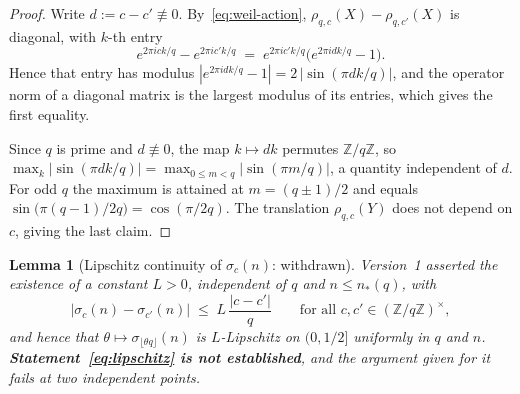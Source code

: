 \documentclass[12pt,a4paper]{article}
\newtheorem{lemma}[theorem]{Lemma}
\theoremstyle{definition}
\theoremstyle{remark}
\begin{document}
    \begin{proof}
      Write $d := c - c' \not\equiv 0$.
      By~\eqref{eq:weil-action}, $\rho_{q,c}(X) - \rho_{q,c'}(X)$ is diagonal, with $k$-th entry
      \begin{equation*}
        e^{2\pi i ck/q} - e^{2\pi i c'k/q}
        \;=\; e^{2\pi i c'k/q}\bigl(e^{2\pi i dk/q} - 1\bigr).
      \end{equation*}
      Hence that entry has modulus
      $|e^{2\pi i dk/q} - 1| = 2\,|\sin(\pi dk/q)|$, and the operator norm of a diagonal
      matrix is the largest modulus of its entries, which gives the first equality.

      Since $q$ is prime and $d \not\equiv 0$, the map $k \mapsto dk$ permutes
      $\mathbb{Z}/q\mathbb{Z}$, so
      $\max_k |\sin(\pi dk/q)| = \max_{0 \leq m < q} |\sin(\pi m/q)|$, a quantity independent
      of $d$.
      For odd $q$ the maximum is attained at $m = (q \pm 1)/2$ and equals
      $\sin\bigl(\pi(q-1)/2q\bigr) = \cos(\pi/2q)$.
      The translation $\rho_{q,c}(Y)$ does not depend on $c$, giving the last claim.
    \end{proof}

    \begin{lemma}[Lipschitz continuity of $\sigma_c(n)$: withdrawn]\label{lem:lipschitz}
      Version~1 asserted the existence of a constant $L > 0$, independent of $q$ and
      $n \leq n_*(q)$, with
      \begin{equation}\label{eq:lipschitz}
        |\sigma_c(n) - \sigma_{c'}(n)| \;\leq\; L\,\frac{|c - c'|}{q}
        \qquad \text{for all } c, c' \in (\mathbb{Z}/q\mathbb{Z})^\times,
      \end{equation}
      and hence that $\theta \mapsto \sigma_{\lfloor\theta q\rfloor}(n)$ is $L$-Lipschitz on
      $(0,1/2]$ uniformly in $q$ and $n$.
      \textbf{Statement~\eqref{eq:lipschitz} is not established}, and the argument given for
      it fails at two independent points.
    \end{lemma}
\end{document}
